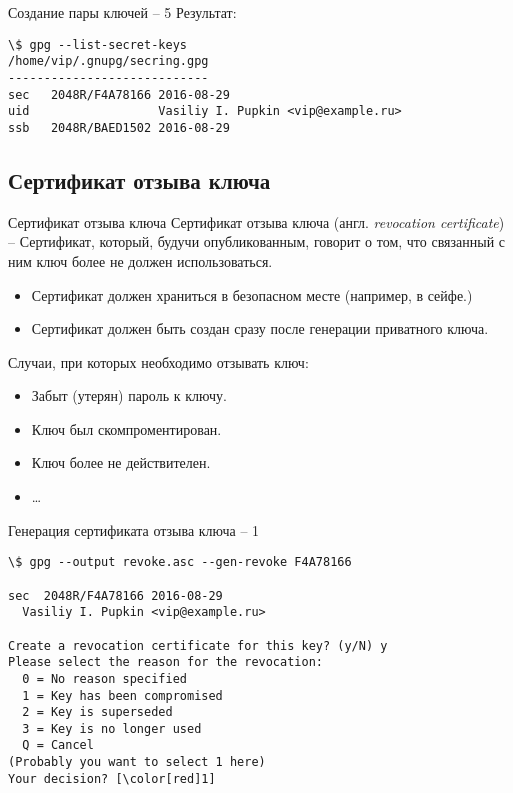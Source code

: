 \documentclass[presentation]{beamer}
\begin{document}
\begin{frame}[fragile]{Создание пары ключей -- 5}
  Результат:
  \begin{Verbatim}[commandchars=\\\[\]]
\$ gpg --list-secret-keys
/home/vip/.gnupg/secring.gpg
----------------------------
sec   2048R/F4A78166 2016-08-29
uid                  Vasiliy I. Pupkin <vip@example.ru>
ssb   2048R/BAED1502 2016-08-29
  \end{Verbatim}
\end{frame}


\subsection{Сертификат отзыва ключа}

\begin{frame}[fragile]{Сертификат отзыва ключа}
  \raisebox{-.30em}{\Large\HandRight}\hspace{.25em} Сертификат отзыва
  ключа (англ. \emph{revocation certificate}) -- Сертификат, который,
  будучи опубликованным, говорит о том, что связанный с ним ключ более
  не должен использоваться.\newline

  \begin{itemize}
  \item Сертификат должен храниться в безопасном месте (например, в
    сейфе.)
  \item Сертификат должен быть создан сразу после генерации приватного
    ключа.\newline
  \end{itemize}
  
  Случаи, при которых необходимо отзывать ключ:
  \begin{itemize}
  \item Забыт (утерян) пароль к ключу.
  \item Ключ был скомпроментирован.
  \item Ключ более не действителен.
  \item \ldots{}
  \end{itemize}
\end{frame}

\begin{frame}[fragile]{Генерация сертификата отзыва ключа -- 1}
\begin{Verbatim}[commandchars=\\\[\]]
\$ gpg --output revoke.asc --gen-revoke F4A78166

sec  2048R/F4A78166 2016-08-29
  Vasiliy I. Pupkin <vip@example.ru>

Create a revocation certificate for this key? (y/N) y
Please select the reason for the revocation:
  0 = No reason specified
  1 = Key has been compromised
  2 = Key is superseded
  3 = Key is no longer used
  Q = Cancel
(Probably you want to select 1 here)
Your decision? [\color[red]1]
\end{Verbatim}
\end{frame}
\end{document}
